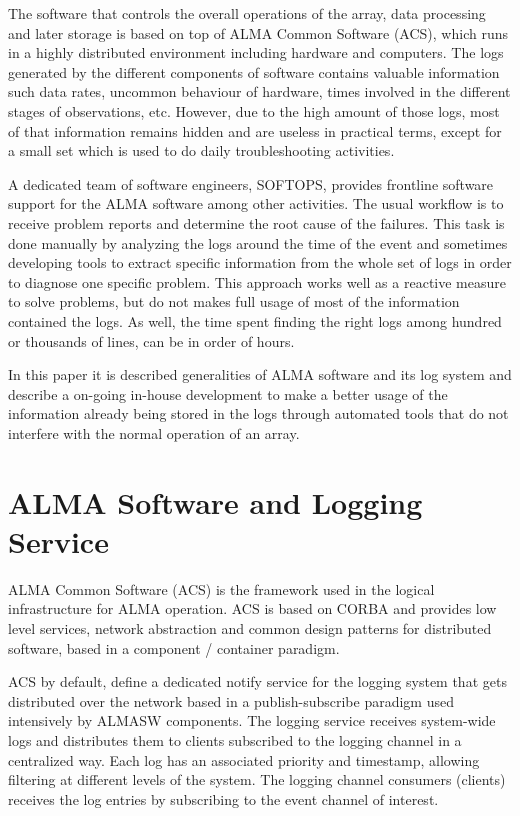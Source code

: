 \documentclass[]{spie}  %
\begin{document}
The software that controls the overall operations of the array, data processing
and later storage is based on top of ALMA Common Software (ACS), which runs in
a highly distributed environment including hardware and computers. The logs
generated by the different components of software contains valuable information
such data rates, uncommon behaviour of hardware, times involved in the
different stages of observations, etc. However, due to the high amount of those
logs, most of that information remains hidden and are useless in practical terms,
except for a small set which is used to do daily troubleshooting activities.

A dedicated team of software engineers, SOFTOPS, provides frontline
software support for the ALMA software among other activities\cite{gonzalez2010first}.
The usual workflow is to receive problem reports and determine the root cause of
the failures. This task is done manually by analyzing the logs around the time of
the event and sometimes developing tools to extract specific information from
the whole set of logs in order to diagnose one specific problem. This approach
works well as a reactive measure to solve problems, but do not makes full usage
of most of the information contained the logs. As well, the time spent finding the
right logs among hundred or thousands of lines, can be in order of hours.

In this paper it is described generalities of ALMA software and its log system and
describe a on-going in-house development to make a better usage of the information
already being stored in the logs through automated tools that do not interfere
with the normal operation of an array.

\section{ALMA Software and Logging Service}
ALMA Common Software (ACS) is the framework used in the logical infrastructure
for ALMA operation. ACS is based on CORBA and provides low level services,
    network abstraction and common design patterns for distributed software,
    based in a component / container paradigm\cite{schwarz2004alma}.

ACS by default, define a dedicated notify service\cite{notifyService} for the 
logging system that gets
distributed over the network based in a publish-subscribe paradigm used
intensively by ALMASW components. The logging service receives system-wide logs 
and distributes them to clients subscribed to the logging channel in a centralized
way. Each log has an associated priority and timestamp, allowing filtering at
different levels of the system. The logging channel consumers (clients) receives 
the log entries by subscribing to the event channel of interest.
\end{document}
